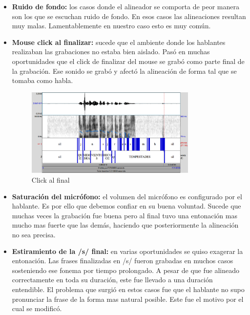 \documentclass[11pt,a4paper,twoside]{tesis}
\begin{document}
\begin{itemize}
    \item \textbf{Ruido de fondo:} los casos donde el alineador se comporta de peor manera son los que se escuchan ruido de fondo. En esos casos las alineaciones resultan muy malas. Lamentablemente en nuestro caso esto es muy común. 

    \item \textbf{Mouse click al finalizar:} sucede que el ambiente donde los hablantes realizaban las grabaciones no estaba bien aislado. Pasó en muchas oportunidades que el click de finalizar del mouse se grabó como parte final de la grabación. Ese sonido se grabó y afectó la alineación de forma tal que se tomaba como habla.
    
\begin{figure}[h!]
    \centerline{\includegraphics[width=0.8\textwidth]{click_al_final_inf} }
    \caption{Click al final}
\end{figure}

    \item \textbf{Saturación del micrófono:} el volumen del micrófono es configurado por el hablante. Es por ello que debemos confiar en su buena voluntad. Sucede que muchas veces la grabación fue buena pero al final tuvo una entonación mas mucho mas fuerte que las demás, haciendo que posteriormente la alineación no sea precisa.

    \item \textbf{Estiramiento de la /s/ final:} en varias oportunidades se quiso exagerar la entonación. Las frases finalizadas en /s/ fueron grabadas en muchos casos sosteniendo ese fonema por tiempo prolongado. A pesar de que fue alineado correctamente en toda su duración, este fue llevado a una duración entendible. El problema que surgió en estos casos fue que el hablante no supo pronunciar la frase de la forma mas natural posible. Este fue el motivo por el cual se modificó.
\end{itemize}
\end{document}
